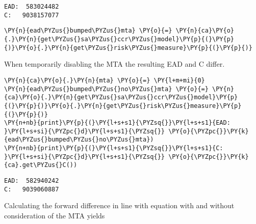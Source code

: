     \begin{Verbatim}[commandchars=\\\{\}]
EAD:  583024482
C:   9038157077
    \end{Verbatim}

    \begin{tcolorbox}[breakable, size=fbox, boxrule=1pt, pad at break*=1mm,colback=cellbackground, colframe=cellborder]
\begin{Verbatim}[commandchars=\\\{\}]
\PY{n}{ead\PYZus{}bumped\PYZus{}mta} \PY{o}{=} \PY{n}{ca}\PY{o}{.}\PY{n}{get\PYZus{}sa\PYZus{}ccr\PYZus{}model}\PY{p}{(}\PY{p}{)}\PY{o}{.}\PY{n}{get\PYZus{}risk\PYZus{}measure}\PY{p}{(}\PY{p}{)}
\end{Verbatim}
\end{tcolorbox}

    When temporarily disabling the MTA the resulting EAD and C differ.

    \begin{tcolorbox}[breakable, size=fbox, boxrule=1pt, pad at break*=1mm,colback=cellbackground, colframe=cellborder]
\begin{Verbatim}[commandchars=\\\{\}]
\PY{n}{ca}\PY{o}{.}\PY{n}{mta} \PY{o}{=} \PY{l+m+mi}{0}
\PY{n}{ead\PYZus{}bumped\PYZus{}no\PYZus{}mta} \PY{o}{=} \PY{n}{ca}\PY{o}{.}\PY{n}{get\PYZus{}sa\PYZus{}ccr\PYZus{}model}\PY{p}{(}\PY{p}{)}\PY{o}{.}\PY{n}{get\PYZus{}risk\PYZus{}measure}\PY{p}{(}\PY{p}{)}
\PY{n+nb}{print}\PY{p}{(}\PY{l+s+s1}{\PYZsq{}}\PY{l+s+s1}{EAD:  }\PY{l+s+si}{\PYZpc{}d}\PY{l+s+s1}{\PYZsq{}} \PY{o}{\PYZpc{}}\PY{k}{ead\PYZus{}bumped\PYZus{}no\PYZus{}mta})
\PY{n+nb}{print}\PY{p}{(}\PY{l+s+s1}{\PYZsq{}}\PY{l+s+s1}{C:   }\PY{l+s+si}{\PYZpc{}d}\PY{l+s+s1}{\PYZsq{}} \PY{o}{\PYZpc{}}\PY{k}{ca}.get\PYZus{}C())
\end{Verbatim}
\end{tcolorbox}

    \begin{Verbatim}[commandchars=\\\{\}]
EAD:  582940242
C:   9039060887
    \end{Verbatim}

    Calculating the forward difference
in line with equation  with and without
consideration of the MTA yields


